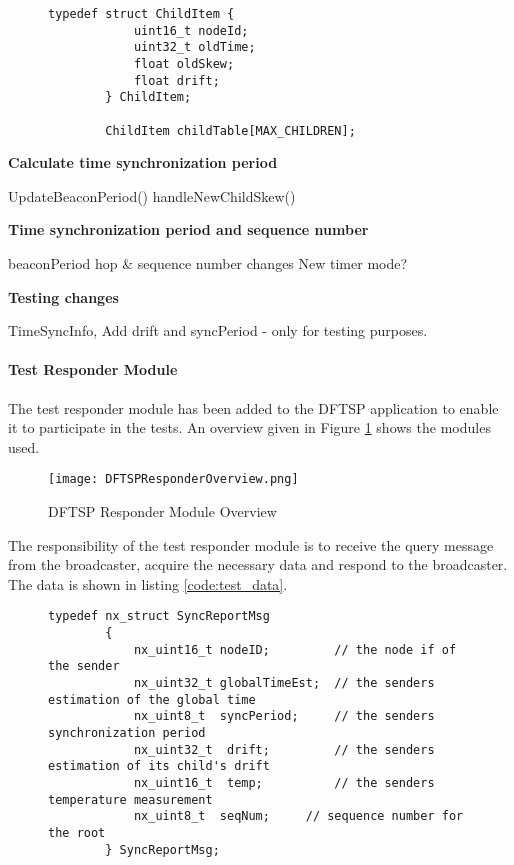 \documentclass[Main]{subfiles}
\begin{document}
					\begin{figure}[H]
						\begin{lstlisting}[caption=Child table, style=Code-C, label=lst:child_table]
		typedef struct ChildItem {
			uint16_t nodeId;
			uint32_t oldTime;
			float oldSkew;
			float drift;
		} ChildItem;

		ChildItem childTable[MAX_CHILDREN];
			    		\end{lstlisting}
			    	\end{figure}
		    	
			    \textbf{Calculate time synchronization period}
			    
			    	UpdateBeaconPeriod()
					handleNewChildSkew()

		    	\textbf{Time synchronization period and sequence number}
			
					beaconPeriod
					hop \& sequence number changes
					New timer mode?
			

				\textbf{Testing changes}

					TimeSyncInfo, Add drift and syncPeriod - only for testing purposes.



			

			
			
			\paragraph{Test Responder Module} %
			\label{par:test_responder_module}
				The test responder module has been added to the DFTSP application to enable it to participate in the tests.
				An overview given in Figure \ref{fig:DFTSPResponderOverview} shows the modules used.

				\begin{figure}[H]
					\centering
					\texttt{[image: DFTSPResponderOverview.png]}
					\caption{DFTSP Responder Module Overview}
					\label{fig:DFTSPResponderOverview}
				\end{figure}

				The responsibility of the test responder module is to receive the query message from the broadcaster, acquire the necessary data and respond to the broadcaster.
				The data is shown in listing \ref{code:test_data}.

				\begin{figure}[H]
					\begin{lstlisting}[caption=DFTSP Test Data, style=Code-C, label=code:test_data]
		typedef nx_struct SyncReportMsg
		{
			nx_uint16_t	nodeID;			// the node if of the sender
			nx_uint32_t	globalTimeEst;	// the senders estimation of the global time
			nx_uint8_t  syncPeriod;		// the senders synchronization period
			nx_uint32_t  drift;			// the senders estimation of its child's drift
			nx_uint16_t  temp;			// the senders temperature measurement
			nx_uint8_t	seqNum;		// sequence number for the root
		} SyncReportMsg;

					\end{lstlisting}
				\end{figure}
\end{document}
